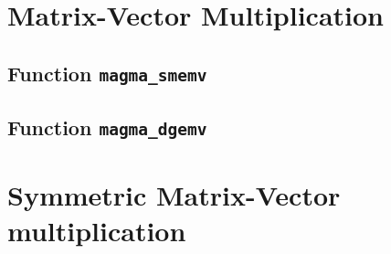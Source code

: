\documentclass[10pt]{book}
\begin{document}
\section{Matrix-Vector Multiplication}
\newpage
\subsection{Function {\tt {\bf magma\_smemv}}}
\newpage
\subsection{Function {\tt {\bf magma\_dgemv}}}

\newpage
\section{Symmetric Matrix-Vector multiplication}

\newpage
\end{document}
